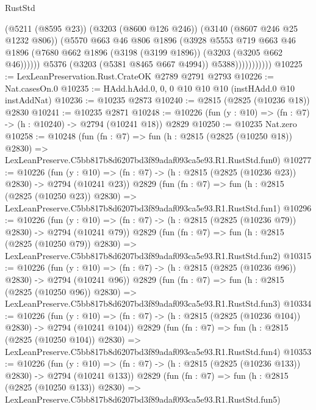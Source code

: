 \begin{lexlean}{RustStd}
\begin{coremodule}
                            (@5211 (@8595 @23))
                            (@3203 (@8600 @126 @246))
                            (@3140 (@8607 @246 @25 @1232 @806))
                            (@5570
                              @663
                              @46
                              @806
                              @1896
                              (@3928
                                @5553
                                @719
                                @663
                                @46
                                @1896
                                (@7680 @662 @1896 (@3198 (@3199 @1896)) (@3203 (@3205 @662 @46))))))
                          @5376
                          (@3203 (@5381 @8465 @667 @4994))
                          @5388)))))))))))
@10225 := LexLeanPreservation.Rust.CrateOK @2789 @2791 @2793
@10226 := Nat.casesOn.{0}
@10235 := HAdd.hAdd.{0, 0, 0} @10 @10 @10 (instHAdd.{0} @10 instAddNat)
@10236 := @10235 @2873
@10240 := @2815 (@2825 (@10236 @18)) @2830
@10241 := @10235 @2871
@10248 := @10226 (fun (y : @10) => (fn : @7) -> (h : @10240) -> @2794 (@10241 @18)) @2829
@10250 := @10235 Nat.zero
@10258 := @10248
    (fun (fn : @7) =>
    fun (h : @2815 (@2825 (@10250 @18)) @2830) =>
    LexLeanPreserve.C5bb817b8d6207bd3f89adaf093ca5e93.R1.RustStd.fun0)
@10277 := @10226
    (fun (y : @10) => (fn : @7) -> (h : @2815 (@2825 (@10236 @23)) @2830) -> @2794 (@10241 @23))
    @2829
    (fun (fn : @7) =>
    fun (h : @2815 (@2825 (@10250 @23)) @2830) =>
    LexLeanPreserve.C5bb817b8d6207bd3f89adaf093ca5e93.R1.RustStd.fun1)
@10296 := @10226
    (fun (y : @10) => (fn : @7) -> (h : @2815 (@2825 (@10236 @79)) @2830) -> @2794 (@10241 @79))
    @2829
    (fun (fn : @7) =>
    fun (h : @2815 (@2825 (@10250 @79)) @2830) =>
    LexLeanPreserve.C5bb817b8d6207bd3f89adaf093ca5e93.R1.RustStd.fun2)
@10315 := @10226
    (fun (y : @10) => (fn : @7) -> (h : @2815 (@2825 (@10236 @96)) @2830) -> @2794 (@10241 @96))
    @2829
    (fun (fn : @7) =>
    fun (h : @2815 (@2825 (@10250 @96)) @2830) =>
    LexLeanPreserve.C5bb817b8d6207bd3f89adaf093ca5e93.R1.RustStd.fun3)
@10334 := @10226
    (fun (y : @10) => (fn : @7) -> (h : @2815 (@2825 (@10236 @104)) @2830) -> @2794 (@10241 @104))
    @2829
    (fun (fn : @7) =>
    fun (h : @2815 (@2825 (@10250 @104)) @2830) =>
    LexLeanPreserve.C5bb817b8d6207bd3f89adaf093ca5e93.R1.RustStd.fun4)
@10353 := @10226
    (fun (y : @10) => (fn : @7) -> (h : @2815 (@2825 (@10236 @133)) @2830) -> @2794 (@10241 @133))
    @2829
    (fun (fn : @7) =>
    fun (h : @2815 (@2825 (@10250 @133)) @2830) =>
    LexLeanPreserve.C5bb817b8d6207bd3f89adaf093ca5e93.R1.RustStd.fun5)

\end{coremodule}
\end{lexlean}
